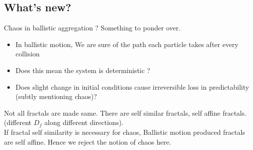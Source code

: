\documentclass{beamer}
\begin{document}
\subsection{What's new?}
\begin{frame} {Chaos in ballistic aggregation ?}
Something to ponder over.
\begin{itemize}
\item {In ballistic motion, We are sure of the path each  particle takes after every collision} 
\item {Does this mean the system is deterministic ?}
\item {Does slight change in initial conditions cause irreversible loss in predictability (subtly mentioning chaos)?}
\end{itemize}
\pause
Not all fractals are made same. There are self similar fractals, self affine fractals. (different $D_f$ along different directions). \\
\vspace{15pt}
\pause 
If fractal self similarity is necessary for chaos, Ballistic motion produced fractals are self affine. Hence we reject the notion of chaos here.  

\end{frame}





 

\end{document}
